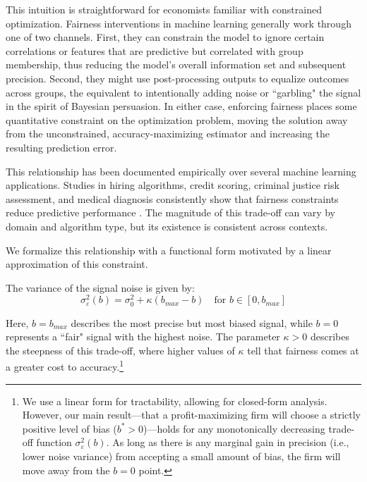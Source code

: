 This intuition is straightforward for economists familiar with constrained optimization. Fairness interventions in machine learning generally work through one of two channels. First, they can constrain the model to ignore certain correlations or features that are predictive but correlated with group membership, thus reducing the model's overall information set and subsequent precision. Second, they might use post-processing outputs to equalize outcomes across groups, the equivalent to intentionally adding noise or ``garbling" the signal in the spirit of Bayesian persuasion. In either case, enforcing fairness places some quantitative constraint on the optimization problem, moving the solution away from the unconstrained, accuracy-maximizing estimator and increasing the resulting prediction error.

This relationship has been documented empirically over several machine learning applications. Studies in hiring algorithms, credit scoring, criminal justice risk assessment, and medical diagnosis consistently show that fairness constraints reduce predictive performance \citep{Kleinberg2017, Chouldechova2017}. The magnitude of this trade-off can vary by domain and algorithm type, but its existence is consistent across contexts.

We formalize this relationship with a functional form motivated by a linear approximation of this constraint.

\begin{definition}
The variance of the signal noise is given by:
\begin{equation}
\sigma_\varepsilon^2(b) = \sigma_0^2 + \kappa(b_{max} - b) \quad \text{for } b \in [0, b_{max}]
\end{equation}
\end{definition}

Here, $b=b_{max}$ describes the most precise but most biased signal, while $b=0$ represents a ``fair" signal with the highest noise. The parameter $\kappa > 0$ describes the steepness of this trade-off, where higher values of $\kappa$ tell that fairness comes at a greater cost to accuracy.\footnote{We use a linear form for tractability, allowing for closed-form analysis. However, our main result—that a profit-maximizing firm will choose a strictly positive level of bias ($b^*>0$)—holds for any monotonically decreasing trade-off function $\sigma_\varepsilon^2(b)$. As long as there is any marginal gain in precision (i.e., lower noise variance) from accepting a small amount of bias, the firm will move away from the $b=0$ point.}

